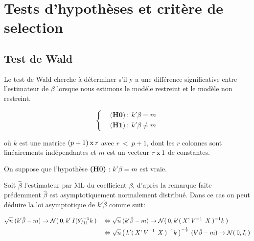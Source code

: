 \documentclass[12pt,fleqn]{book} %
\begin{document}
\newpage



\chapter{Tests d'hypothèses et critère de selection}



\section{Test de Wald}

\vspace{1em} 

Le test de Wald cherche à déterminer s’il y a une différence significative entre l'estimateur de $\beta$ lorsque nous estimons le modèle restreint et le modèle non restreint.

\vspace{1em}

\begin{equation*}
\left\{\begin{aligned} & \textbf{(H0)} \: : \: k'\beta=m \\
 & \textbf{(H1)} \: : \: k'\beta\neq m \end{aligned} \right.
\end{equation*}

\vspace{0.5em}

où $k$ est une matrice $(p+1)\:\textnormal{x}\:r$ \: avec $ r\:<\:p+1 $, dont les $r$ colonnes sont linéairements indépendantes et $m$ est un vecteur $r\:\textnormal{x}\: 1$ de constantes.

\vspace{1em}

On suppose que l'hypothèse \textbf{(H0)} : $k'\beta=m$ est vraie.

\vspace{1em}
  
Soit $\hat{\beta}$ l'estimateur par ML du coefficient $\beta$, d'après la remarque faite prédemment $\hat{\beta}$ est asymptotiquement normalement distribué. Dans ce cas on peut déduire la loi asymptotique de $k'\hat{\beta}$ comme suit:


\begin{align*}
 \sqrt{n}\:(k'\hat{\beta}-m)\rightarrow \mathcal{N}(\:0,k'\:I(\theta)_{11}^{-1} k\:) \quad
 &\Leftrightarrow \sqrt{n}\:(k'\hat{\beta}-m)\rightarrow \mathcal{N}(\:0,k' (\:X\textnormal{'} \:V^{-1}\:\: X\:)^{-1} k\:)\\
 &\Leftrightarrow  \sqrt{n} \left(\:k' (\:X\textnormal{'} \:V^{-1}\:\: X\:)^{-1} k\:\right)^{-\frac{1}{2}} \:(k'\hat{\beta}-m) \rightarrow \mathcal{N}(\:0,I_r)
 \end{align*}
 
\end{document}
